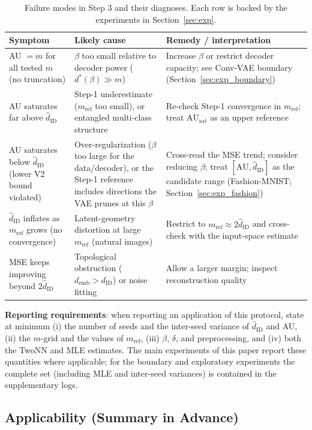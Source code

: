 \documentclass[make,article,submit,pdftex,moreauthors]{Definitions/mdpi}
\newcommand{\dID}{d_{\mathrm{ID}}}
\newcommand{\hatdID}{\hat{d}_{\mathrm{ID}}}
\newcommand{\AUsat}{\mathrm{AU}_{\mathrm{sat}}}
\newcommand{\demb}{d_{\mathrm{emb}}}
\newcommand{\dstar}{d^{*}(\beta)}
\begin{document}
\begin{table}[H]
\caption{Failure modes in Step 3 and their diagnoses. Each row is backed by
the experiments in Section~\ref{sec:exp}.}
\label{tab:failure}
\small
\begin{tabular}{p{3.9cm}p{4.3cm}p{4.3cm}}
\toprule
\textbf{Symptom} & \textbf{Likely cause} & \textbf{Remedy / interpretation} \\
\midrule
AU $= m$ for all tested $m$ (no truncation) & $\beta$ too small relative to decoder power ($\dstar \gg m$) & Increase $\beta$ or restrict decoder capacity; see Conv-VAE boundary (Section~\ref{sec:exp_boundary}) \\
AU saturates far above $\hatdID$ & Step-1 underestimate ($m_{\mathrm{ref}}$ too small), or entangled multi-class structure & Re-check Step-1 convergence in $m_{\mathrm{ref}}$; treat $\AUsat$ as an upper reference \\
AU saturates below $\hatdID$ (lower V2 bound violated) & Over-regularization ($\beta$ too large for the data/decoder), or the Step-1 reference includes directions the VAE prunes at this $\beta$ & Cross-read the MSE trend; consider reducing $\beta$; treat $[\mathrm{AU}, \hatdID]$ as the candidate range (Fashion-MNIST; Section~\ref{sec:exp_fashion}) \\
$\hatdID$ inflates as $m_{\mathrm{ref}}$ grows (no convergence) & Latent-geometry distortion at large $m_{\mathrm{ref}}$ (natural images) & Restrict to $m_{\mathrm{ref}} \approx 2\hatdID$ and cross-check with the input-space estimate \\
MSE keeps improving beyond $2\hatdID$ & Topological obstruction ($\demb > \dID$) or noise fitting & Allow a larger margin; inspect reconstruction quality \\
\bottomrule
\end{tabular}
\end{table}

\textbf{Reporting requirements}:
when reporting an application of this protocol, state at minimum
(i) the number of seeds and the inter-seed variance of $\hatdID$ and AU,
(ii) the $m$-grid and the values of $m_{\mathrm{ref}}$,
(iii) $\beta$, $\delta$, and preprocessing, and
(iv) both the TwoNN and MLE estimates.
The main experiments of this paper report these quantities where
applicable; for the boundary and exploratory experiments the complete set
(including MLE and inter-seed variances) is contained in the supplementary
logs.

\subsection{Applicability (Summary in Advance)}\label{sec:protocol_applicability}
\end{document}
